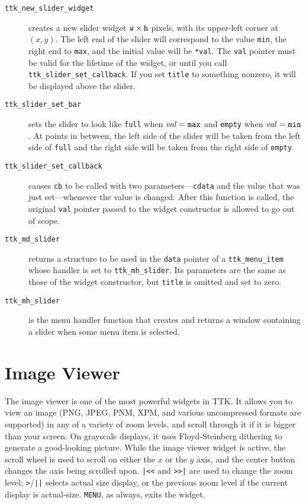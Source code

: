 \documentclass[12pt,letterpaper]{report}
\let\ttt\tt
\def\tt{\def\_{{\ttt\char`\_}}\ttt}
\begin{document}
\begin{description}
\item[{\tt ttk_new_slider_widget}] creates a new slider widget $\verb|w| \times \verb|h|$ pixels, with its
upper-left corner at $(x,y)$. The left end of the slider will correspond to the value \verb|min|, the right
end to \verb|max|, and the initial value will be \verb|*val|. The \verb|val| pointer must be valid for the
lifetime of the widget, or until you call \verb|ttk_slider_set_callback|. If you set \verb|title| to something
nonzero, it will be displayed above the slider.
\item[{\tt ttk_slider_set_bar}] sets the slider to look like \verb|full| when ${\it val} = \verb|max|$ and
\verb|empty| when ${\it val} = \verb|min|$. At points in between, the left side of the slider will be taken
from the left side of \verb|full| and the right side will be taken from the right side of \verb|empty|.
\item[{\tt ttk_slider_set_callback}] causes \verb|cb| to be called with two parameters---\verb|cdata| and the
value that was just set---whenever the value is changed. After this function is called, the original \verb|val|
pointer passed to the widget constructor is allowed to go out of scope.
\item[{\tt ttk_md_slider}] returns a structure to be used in the \verb|data| pointer of a \verb|ttk_menu_item|
whose handler is set to \verb|ttk_mh_slider|. Its parameters are the same as those of the widget constructor,
but \verb|title| is omitted and set to zero.
\item[{\tt ttk_mh_slider}] is the menu handler function that creates and returns a window containing a slider
when some menu item is selected.
\end{description}

\section{Image Viewer}
The image viewer is one of the most powerful widgets in TTK. It allows you to view an image (PNG, JPEG, PNM,
XPM, and various uncompressed formats are supported) in any of a variety of zoom levels, and scroll through it if
it is bigger than your screen. On grayscale displays, it uses Floyd-Steinberg dithering to generate a good-looking
picture. While the image viewer widget is active, the scroll wheel is used to scroll on either the $x$ or the $y$ axis,
and the center button changes the axis being scrolled upon. \verb:|<<: and \verb:>>|: are used to change the zoom
level; \verb|>|/\verb:||: selects actual size display, or the previous zoom level if the current display is actual-size.
\verb|MENU|, as always, exits the widget.
\end{document}
